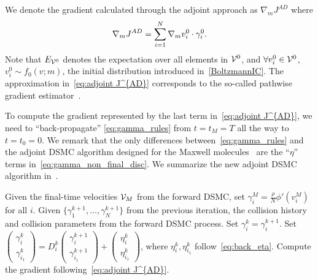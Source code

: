 \documentclass[12pt,nopreprintline]{elsarticle}
\begin{document}
We denote the gradient calculated through the adjoint approach as  $\nabla_m J^{AD}$ where
\begin{equation}\label{eq:adjoint J^{AD}}
\nabla_m J^{AD} =  \sum_{i=1}^N \nabla_m  v_{i}^0  \cdot \gamma_i^0.
\end{equation}
Note that $E_{\mathcal V^0 }$ denotes the expectation over all elements in ${\mathcal V^0 }$, and $\forall v_i^0\in \mathcal V^0 $, $ v_i^0\sim f_0(v;m)$, the initial distribution introduced in~\eqref{BoltzmannIC}. The approximation in~\eqref{eq:adjoint J^{AD}} corresponds to the so-called pathwise gradient estimator~\cite[Section 5]{mohamed2019monte}. 



To compute the gradient represented by the last term in~\eqref{eq:adjoint J^{AD}}, we need to ``back-propagate'' \eqref{eq:gamma_rules} from $t=t_M = T$ all the way to $t=t_0 = 0$. We remark that the only differences between~\eqref{eq:gamma_rules} and the adjoint DSMC algorithm designed for the Maxwell molecules~\cite{caflisch2021adjoint} are the ``$\eta$'' terms in~\eqref{eq:gamma_non_final_disc}. We summarize the new adjoint DSMC algorithm in~.

\begin{algorithm}[ht!]
\caption{Solve the discrete adjoint DSMC system and compute the gradient~\eqref{eq:adjoint J^{AD}}.~\label{alg:adjoint_VHS}}
\begin{algorithmic}[1]
\State Given the final-time velocities $\mathcal V_{M}$ from the forward DSMC, set $\gamma_i^{M} = \frac{\rho}{N}\phi'(v^{M}_i)$ for  all $i$.
\State Given $\{\gamma_{1}^{k+1},\ldots, \gamma_{N}^{k+1}\}$ from the previous iteration, the collision history and collision parameters from the forward DSMC process.
\State Set $\gamma_{i}^k = \gamma_i^{k+1}$.
\State Set $\begin{pmatrix}  \gamma_i^k \\  \gamma_{i_1}^k     \end{pmatrix}  =   D_i^k \begin{pmatrix}   \gamma_{i}^{k+1} \\  \gamma_{i_1}^{k+1}  \end{pmatrix} + {\begin{pmatrix}  \eta_{i}^k \\  \eta_{i_1}^k     \end{pmatrix}}$, where $\eta_{i}^k,\eta_{i_1}^k$ follow~\eqref{eq:back_eta}.
\EndIf
\EndFor
\State Compute the gradient following~\eqref{eq:adjoint J^{AD}}.
\end{algorithmic}
\end{algorithm}
\end{document}
